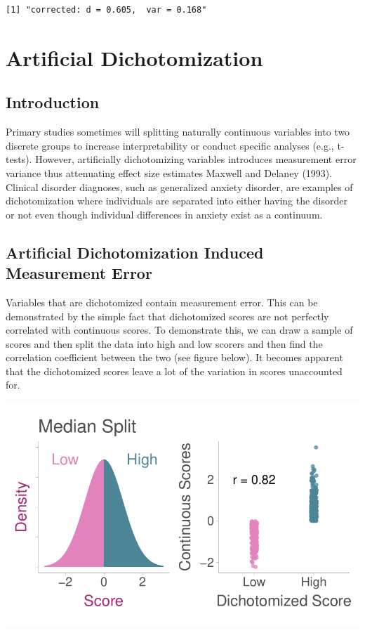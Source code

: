 \documentclass[
  letterpaper,
  DIV=11,
  numbers=noendperiod]{scrreprt}
\begin{document}
\begin{verbatim}
[1] "corrected: d = 0.605,  var = 0.168"
\end{verbatim}

\hypertarget{artificial-dichotomization}{%
\chapter{Artificial Dichotomization}\label{artificial-dichotomization}}

\hypertarget{introduction-3}{%
\section{Introduction}\label{introduction-3}}

Primary studies sometimes will splitting naturally continuous variables
into two discrete groups to increase interpretability or conduct
specific analyses (e.g., t-tests). However, artificially dichotomizing
variables introduces measurement error variance thus attenuating effect
size estimates Maxwell and Delaney (1993). Clinical disorder diagnoses,
such as generalized anxiety disorder, are examples of dichotomization
where individuals are separated into either having the disorder or not
even though individual differences in anxiety exist as a continuum.

\hypertarget{artificial-dichotomization-induced-measurement-error}{%
\section{Artificial Dichotomization Induced Measurement
Error}\label{artificial-dichotomization-induced-measurement-error}}

Variables that are dichotomized contain measurement error. This can be
demonstrated by the simple fact that dichotomized scores are not
perfectly correlated with continuous scores. To demonstrate this, we can
draw a sample of scores and then split the data into high and low
scorers and then find the correlation coefficient between the two (see
figure below). It becomes apparent that the dichotomized scores leave a
lot of the variation in scores unaccounted for.

\includegraphics{artificial_dichotomization_files/figure-pdf/unnamed-chunk-1-1.pdf}
\end{document}
